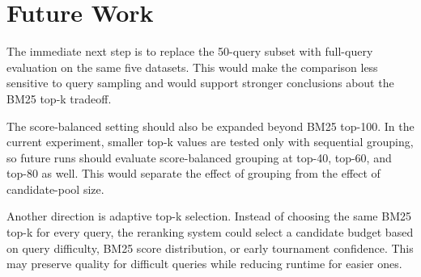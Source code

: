 \section{Future Work}
\label{sec:future-work}

The immediate next step is to replace the 50-query subset with full-query evaluation on the same five datasets.
This would make the comparison less sensitive to query sampling and would support stronger conclusions about the BM25 top-k tradeoff.

The score-balanced setting should also be expanded beyond BM25 top-100.
In the current experiment, smaller top-k values are tested only with sequential grouping, so future runs should evaluate score-balanced grouping at top-40, top-60, and top-80 as well.
This would separate the effect of grouping from the effect of candidate-pool size.

Another direction is adaptive top-k selection.
Instead of choosing the same BM25 top-k for every query, the reranking system could select a candidate budget based on query difficulty, BM25 score distribution, or early tournament confidence.
This may preserve quality for difficult queries while reducing runtime for easier ones.
